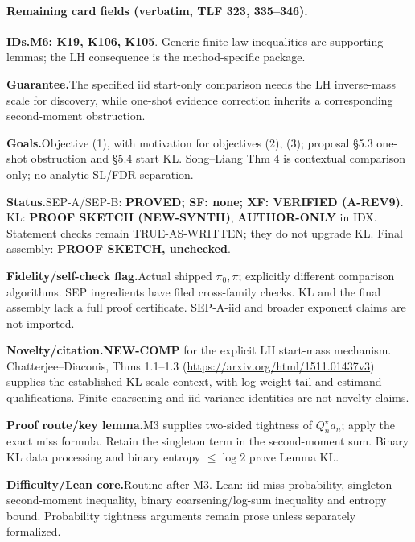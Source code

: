 \paragraph{Remaining card fields (verbatim, TLF 323, 335–346).}
{\small
\par\smallskip\noindent\textbf{IDs.}\enspace \textbf{M6: K19, K106, K105}. Generic finite-law inequalities are supporting lemmas; the LH consequence is the method-specific package.
\par\smallskip\noindent\textbf{Guarantee.}\enspace The specified iid start-only comparison needs the LH inverse-mass scale for discovery, while one-shot evidence correction inherits a corresponding second-moment obstruction.
\par\smallskip\noindent\textbf{Goals.}\enspace Objective (1), with motivation for objectives (2), (3); proposal §5.3 one-shot obstruction and §5.4 start KL. Song–Liang Thm 4 is contextual comparison only; no analytic SL/FDR separation.
\par\smallskip\noindent\textbf{Status.}\enspace SEP-A/SEP-B: \textbf{PROVED; SF: none; XF: VERIFIED (A-REV9)}. KL: \textbf{PROOF SKETCH (NEW-SYNTH)}, \textbf{AUTHOR-ONLY} in IDX. Statement checks remain TRUE-AS-WRITTEN; they do not upgrade KL. Final assembly: \textbf{PROOF SKETCH, unchecked}.
\par\smallskip\noindent\textbf{Fidelity/self-check flag.}\enspace Actual shipped \(\pi_0,\pi\); explicitly different comparison algorithms. SEP ingredients have filed cross-family checks. KL and the final assembly lack a full proof certificate. SEP-A-iid and broader exponent claims are not imported.
\par\smallskip\noindent\textbf{Novelty/citation.}\enspace \textbf{NEW-COMP} for the explicit LH start-mass mechanism. Chatterjee–Diaconis, Thms 1.1–1.3 (\url{https://arxiv.org/html/1511.01437v3}) supplies the established KL-scale context, with log-weight-tail and estimand qualifications. Finite coarsening and iid variance identities are not novelty claims.
\par\smallskip\noindent\textbf{Proof route/key lemma.}\enspace M3 supplies two-sided tightness of \(Q_n^\star a_n\); apply the exact miss formula. Retain the singleton term in the second-moment sum. Binary KL data processing and binary entropy \(\le\log2\) prove Lemma KL.
\par\smallskip\noindent\textbf{Difficulty/Lean core.}\enspace Routine after M3. Lean: iid miss probability, singleton second-moment inequality, binary coarsening/log-sum inequality and entropy bound. Probability tightness arguments remain prose unless separately formalized.
}
